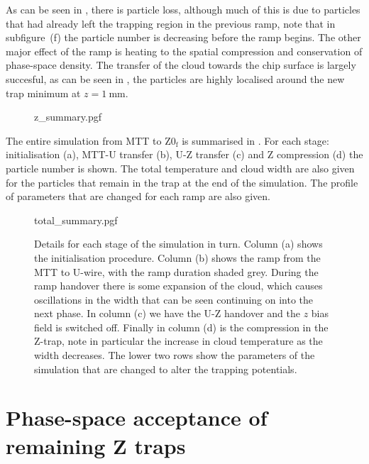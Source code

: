 As can be seen in , there is particle loss,
although much of this is due to particles that had already left the trapping
region in the previous ramp, note that in subfigure~(f) the particle number is
decreasing before the ramp begins. The other major effect of the ramp is
heating to the spatial compression and conservation of phase-space density.
%
The transfer of the cloud towards the chip surface is largely succesful, as can
be seen in , the particles are highly localised
around the new trap minimum at $z=\SI{1}{\milli\meter}$.

\begin{figure}[p]
\centering
  {z_summary.pgf}
  \caption{
  }
  \label{design:fig:zsim}
\end{figure}

The entire simulation from MTT to $\mathrm{Z0_f}$ is summarised in
. For each stage: initialisation (a), MTT-U
transfer (b), U-Z transfer (c) and Z compression (d) the particle number is
shown. The total temperature and cloud width are also given for the particles
that remain in the trap at the end of the simulation. The profile of parameters
that are changed for each ramp are also given.

\begin{figure}[p]
\centering
  {total_summary.pgf}
  \caption{
    Details for each stage of the simulation in turn. Column (a) shows the
    initialisation procedure. Column (b) shows the ramp from the MTT to U-wire,
    with the ramp duration shaded grey. During the ramp handover there is some
    expansion of the cloud, which causes oscillations in the width that can be
    seen continuing on into the next phase. In column (c) we have the U-Z
    handover and the $z$ bias field is switched off. Finally in column (d) is the
    compression in the Z-trap, note in particular the increase in cloud
    temperature as the width decreases. The lower two rows show the parameters
    of the simulation that are changed to alter the trapping potentials.
  }
  \label{design:fig:simsum}
\end{figure}


\section{Phase-space acceptance of remaining Z traps}
\label{design:transferbetweenzs}


